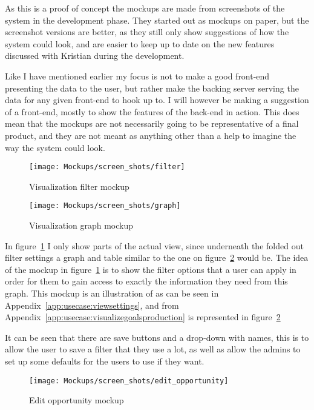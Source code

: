 As this is a proof of concept the mockups are made from screenshots of the
system in the development phase. They started out as mockups on paper, but the
screenshot versions are better, as they still only show suggestions of how the
system could look, and are easier to keep up to date on the new features
discussed with Kristian during the development.

Like I have mentioned earlier my focus is not to make a good front-end presenting
the data to the user, but rather make the backing server serving the data for
any given front-end to hook up to. I will however be making a suggestion of a
front-end, mostly to show the features of the back-end in action. This does
mean that the mockups are not necessarily going to be representative of
a final product, and they are not meant as anything other than a help to
imagine the way the system could look. 

\begin{figure}[!htb]
  \centering
  \texttt{[image: Mockups/screen\_shots/filter]}
  \caption{Visualization filter mockup}
\label{fig:VisualizationFilter}
\end{figure}

\begin{figure}[!htb]
  \centering
  \texttt{[image: Mockups/screen\_shots/graph]}
  \caption{Visualization graph mockup}
\label{fig:VisualizationView}
\end{figure}

In figure~\ref{fig:VisualizationFilter} I only show parts  of the actual view,
since underneath the folded out filter settings a graph and table similar to the
one on figure~\ref{fig:VisualizationView} would be. The idea of the mockup in
figure~\ref{fig:VisualizationFilter} is to show the filter options that a user
can apply in order for them to gain access to exactly the information they need
from this graph. This mockup is an illustration of
 as can be seen in
Appendix~\ref{app:usecase:viewsettings}, and
 from
Appendix~\ref{app:usecase:visualizegoalsproduction} is represented in figure~\ref{fig:VisualizationView}

It can be seen that there are save buttons and a drop-down with names, this is to
allow the user to save a filter that they use a lot, as well as allow the admins
to set up some defaults for the users to use if they want.

\begin{figure}[!htb]
  \centering
  \texttt{[image: Mockups/screen\_shots/edit\_opportunity]}
  \caption{Edit opportunity mockup}
\label{fig:OpportunityView}
\end{figure}

